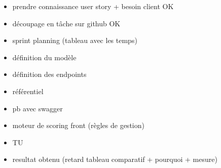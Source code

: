 	
	\newpage
\begin{itemize}
	\item prendre connaissance user story + besoin client OK
	\item découpage en tâche sur github OK
	\item sprint planning (tableau avec les temps)
	\item définition du modèle
	\item définition des endpoints
	\item référentiel
	\item pb avec swagger
	\item moteur de scoring front (règles de gestion)
	\item TU
	\item resultat obtenu (retard tableau comparatif + pourquoi + mesure)
\end{itemize}